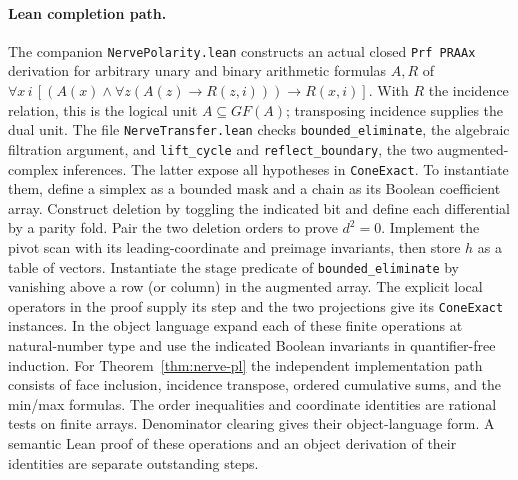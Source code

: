 \paragraph{Lean completion path.}
The companion \texttt{NervePolarity.lean} constructs an actual closed
\texttt{Prf PRAAx} derivation for arbitrary unary and binary arithmetic formulas $A,R$ of
$\forall x\,i\,[(A(x)\land\forall z(A(z)\to R(z,i)))\to R(x,i)]$.
With $R$ the incidence relation, this is the logical unit $A\subseteq GF(A)$;
transposing incidence supplies the dual unit. The file
\texttt{NerveTransfer.lean} checks
\texttt{bounded\_eliminate}, the algebraic filtration argument, and
\texttt{lift\_cycle} and \texttt{reflect\_boundary}, the two augmented-complex
inferences. The latter expose all hypotheses in \texttt{ConeExact}.
To instantiate them, define a simplex as a bounded mask and a chain as its
Boolean coefficient array. Construct deletion by toggling the indicated
bit and define each differential by a parity fold. Pair the two deletion
orders to prove $d^2=0$. Implement the pivot scan with its leading-coordinate
and preimage invariants, then store $h$ as a table of vectors. Instantiate
the stage predicate of \texttt{bounded\_eliminate} by vanishing above a
row (or column) in the augmented array. The explicit local operators in
the proof supply its step and the two projections give its
\texttt{ConeExact} instances. In the object language expand each of these
finite operations at natural-number type and use the indicated Boolean
invariants in quantifier-free induction. For Theorem~\ref{thm:nerve-pl}
the independent implementation path consists of face inclusion, incidence
transpose, ordered cumulative sums, and the min/max formulas. The order
inequalities and coordinate identities are rational tests on finite
arrays. Denominator clearing gives their object-language form. A semantic
Lean proof of these operations and an object derivation of their identities
are separate outstanding steps.



